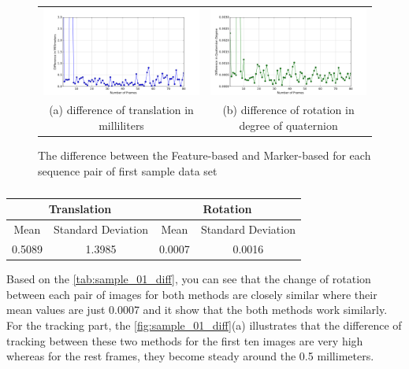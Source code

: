 \begin{figure}[H]
\begin{tabular}{cc}
  \includegraphics[width=80mm]{figures/diff_0/graph_translation} &  \includegraphics[width=80mm]{figures/diff_0/graph_rotation} \\
(a) difference of translation in milliliters & (b) difference of rotation in degree of quaternion \\[6pt]
\end{tabular}
\caption{The difference between the Feature-based and Marker-based for each sequence pair of first sample data set}\label{fig:sample_01_diff}
\end{figure}

\begin{table}[H]
\centering
  \begin{tabular}{| c | c | c | c |}
      \hline
      \multicolumn{2}{|c|}{Translation} & \multicolumn{2}{c|}{Rotation} \\ \hline
       Mean & Standard Deviation & Mean & Standard Deviation \\ \hline
      0.5089 & 1.3985 & 0.0007 & 0.0016 \\ \hline
  \end{tabular}
  \caption{} \label{tab:sample_01_diff}
\end{table}

Based on the \autoref{tab:sample_01_diff}, you can see that the change of rotation between each pair of images for both methods are closely similar where their mean values are just 0.0007 and it show that the both methods work similarly. For the tracking part, the \autoref{fig:sample_01_diff}(a) illustrates that the difference of tracking between these two methods for the first ten images are very high whereas for the rest frames, they become steady around the 0.5 millimeters.

